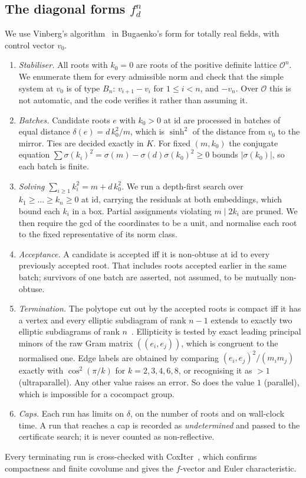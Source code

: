 \documentclass[11pt]{amsart}
\theoremstyle{definition}
\newcommand{\OK}{\mathcal{O}}
\newcommand{\id}{\mathrm{id}}
\begin{document}
\subsection{The diagonal forms $f_d^n$}
We use Vinberg's algorithm~\cite{Vin72} in Bugaenko's form for totally real fields, with
control vector $v_0$.
\begin{enumerate}
\item \emph{Stabiliser.} All roots with $k_0=0$ are roots of the positive definite lattice
  $\OK^n$. We enumerate them for every admissible norm and check that the simple system at
  $v_0$ is of type $B_n$: $v_{i+1}-v_i$ for $1\le i<n$, and $-v_n$. Over $\OK$ this is not
  automatic, and the code verifies it rather than assuming it.
\item \emph{Batches.} Candidate roots $e$ with $k_0>0$ at $\id$ are processed in batches of
  equal distance $\delta(e)=d\,k_0^2/m$, which is $\sinh^2$ of the distance from $v_0$ to the
  mirror. Ties are decided exactly in $K$. For fixed $(m,k_0)$ the conjugate equation
  $\sum\sigma(k_i)^2=\sigma(m)-\sigma(d)\sigma(k_0)^2\ge0$ bounds $|\sigma(k_0)|$, so each
  batch is finite.
\item \emph{Solving $\sum_{i\ge1}k_i^2=m+d\,k_0^2$.} We run a depth-first search over
  $k_1\ge\dots\ge k_n\ge0$ at $\id$, carrying the residuals at both embeddings, which bound
  each $k_i$ in a box. Partial assignments violating $m\mid2k_i$ are pruned. We then require
  the gcd of the coordinates to be a unit, and normalise each root to the fixed
  representative of its norm class.
\item \emph{Acceptance.} A candidate is accepted iff it is non-obtuse at $\id$ to every
  previously accepted root. That includes roots accepted earlier in the same batch;
  survivors of one batch are asserted, not assumed, to be mutually non-obtuse.
\item \emph{Termination.} The polytope cut out by the accepted roots is compact iff it has a
  vertex and every elliptic subdiagram of rank $n-1$ extends to exactly two elliptic
  subdiagrams of rank $n$~\cite{Vin72}. Ellipticity is tested by exact leading principal
  minors of the raw Gram matrix $((e_i,e_j))$, which is congruent to the normalised one. Edge
  labels are obtained by comparing $(e_i,e_j)^2/(m_im_j)$ exactly with $\cos^2(\pi/k)$ for
  $k=2,3,4,6,8$, or recognising it as $>1$ (ultraparallel). Any other value raises an error.
  So does the value $1$ (parallel), which is impossible for a cocompact group.
\item \emph{Caps.} Each run has limits on $\delta$, on the number of roots and on wall-clock
  time. A run that reaches a cap is recorded as \emph{undetermined} and passed to the
  certificate search; it is never counted as non-reflective.
\end{enumerate}
Every terminating run is cross-checked with CoxIter~\cite{CoxIter}, which confirms
compactness and finite covolume and gives the $f$-vector and Euler characteristic.
\end{document}
